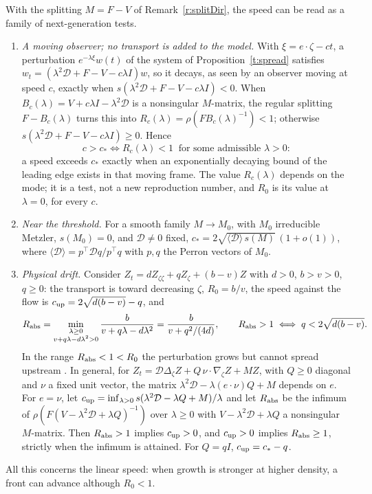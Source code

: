 \label{r:movNGM}
With the splitting $M=F-V$ of Remark~\ref{r:splitDir}, the speed can be read as a family of next-generation tests.
\begin{enumerate}
\item \emph{A moving observer; no transport is added to the model.} With $\xi=e\cdot\zeta-ct$, a perturbation $e^{-\lambda\xi}w(t)$ of the system of Proposition~\ref{t:spread} satisfies $w_t=(\lambda^2\mathcal D+F-V-c\lambda I)w$, so it decays, as seen by an observer moving at speed $c$, exactly when $s(\lambda^2\mathcal D+F-V-c\lambda I)<0$. When $B_c(\lambda)=V+c\lambda I-\lambda^2\mathcal D$ is a nonsingular $M$-matrix, the regular splitting $F-B_c(\lambda)$ turns this into $R_c(\lambda)=\rho(FB_c(\lambda)^{-1})<1$; otherwise $s(\lambda^2\mathcal D+F-V-c\lambda I)\ge0$. Hence
\[
 c>c_*\iff R_c(\lambda)<1\ \text{ for some admissible }\lambda>0:
\]
a speed exceeds $c_*$ exactly when an exponentially decaying bound of the leading edge exists in that moving frame. The value $R_c(\lambda)$ depends on the mode; it is a test, not a new reproduction number, and $R_0$ is its value at $\lambda=0$, for every $c$.
\item \emph{Near the threshold.} For a smooth family $M\to M_0$, with $M_0$ irreducible Metzler, $s(M_0)=0$, and $\mathcal D\ne0$ fixed, $c_*=2\sqrt{\langle\mathcal D\rangle\,s(M)}\,(1+o(1))$, where $\langle\mathcal D\rangle=p^\top\mathcal Dq/p^\top q$ with $p,q$ the Perron vectors of $M_0$.
\item \emph{Physical drift.} Consider $Z_t=dZ_{\zeta\zeta}+qZ_\zeta+(b-v)Z$ with $d>0$, $b>v>0$, $q\ge0$: the transport is toward decreasing $\zeta$, $R_0=b/v$, the speed against the flow is $c_{\rm up}=2\sqrt{d(b-v)}-q$, and
\[
 R_{\rm abs}=\min_{\substack{\lambda\ge0\\v+q\lambda-d\lambda^2>0}}\frac b{v+q\lambda-d\lambda^2}=\frac b{v+q^2/(4d)},\qquad R_{\rm abs}>1\iff q<2\sqrt{d(b-v)}.
\]
In the range $R_{\rm abs}<1<R_0$ the perturbation grows but cannot spread upstream \cite{SpeirsGurney2001}. In general, for $Z_t=\mathcal D\Delta_\zeta Z+Q\,\nu\cdot\nabla_\zeta Z+MZ$, with $Q\ge0$ diagonal and $\nu$ a fixed unit vector, the matrix $\lambda^2\mathcal D-\lambda(e\cdot\nu)Q+M$ depends on $e$. For $e=\nu$, let $c_{\rm up}=\inf_{\lambda>0}s(\lambda^2\mathcal D-\lambda Q+M)/\lambda$ and let $R_{\rm abs}$ be the infimum of $\rho(F(V-\lambda^2\mathcal D+\lambda Q)^{-1})$ over $\lambda\ge0$ with $V-\lambda^2\mathcal D+\lambda Q$ a nonsingular $M$-matrix. Then $R_{\rm abs}>1$ implies $c_{\rm up}>0$, and $c_{\rm up}>0$ implies $R_{\rm abs}\ge1$, strictly when the infimum is attained. For $Q=qI$, $c_{\rm up}=c_*-q$.
\end{enumerate}
All this concerns the linear speed: when growth is stronger at higher density, a front can advance although $R_0<1$.
\eeR

